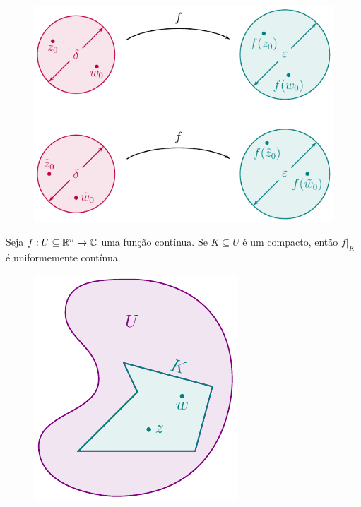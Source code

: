 %
\begin{figure}[H]\centering
    \includegraphics{Figuras/continuidade uniforme.pdf}
\end{figure}
%
\begin{teorema}
Seja $f:U\subseteq\mathbb{R}^n\to\mathbb{C}$ uma função contínua. Se $K\subseteq U$ é um compacto,
então $f\big|_K$ é uniformemente contínua.
\end{teorema}
%
\begin{figure}[H]\centering
    \includegraphics{Figuras/K em U.pdf}
\end{figure}
%
